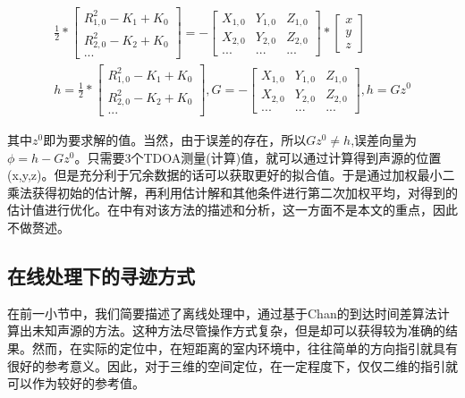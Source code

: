 \documentclass[winfonts]{njuthesis}
\begin{document}
		\begin{equation}
		\begin{aligned}
			& \frac{1}{2} * {
				\left[ 
					\begin{array}{c}
						R_{1,0}^2 - K_1 + K_0 \\
						R_{2,0}^2 - K_2 + K_0 \\
						...
					\end{array} 
				\right ]}
				= -{
				\left[ 
					\begin{array}{ccc}
						X_{1,0} & Y_{1,0} & Z_{1,0} \\
						X_{2,0} & Y_{2,0} & Z_{2,0} \\
						  ...   &  ...    &   ...
					\end{array}
				\right ]}*{
				\left[ 
					\begin{array}{c}
						x\\
						y\\
						z
					\end{array}
				\right ]} & \\
			& h = \frac{1}{2} * {
				\left[ 
				\begin{array}{c}
				R_{1,0}^2 - K_1 + K_0 \\
				R_{2,0}^2 - K_2 + K_0 \\
				...
				\end{array} 
				\right ]}, 
			G = -{
				\left[ 
				\begin{array}{ccc}
				X_{1,0} & Y_{1,0} & Z_{1,0} \\
				X_{2,0} & Y_{2,0} & Z_{2,0} \\
				...   &  ...    &   ...
				\end{array}
				\right ]},
			h = Gz^0
		\end{aligned}
		\end{equation}

		其中$z^0$即为要求解的值。当然，由于误差的存在，所以$Gz^0\neq h$,误差向量为$\phi = h - Gz^0$。只需要3个TDOA测量(计算)值，就可以通过计算得到声源的位置(x,y,z)。但是充分利于冗余数据的话可以获取更好的拟合值。于是通过加权最小二乘法获得初始的估计解，再利用估计解和其他条件进行第二次加权平均，对得到的估计值进行优化。在\cite{Chan3DTDOA}中有对该方法的描述和分析，这一方面不是本文的重点，因此不做赘述。
		
		\subsection{在线处理下的寻迹方式}
		
		在前一小节中，我们简要描述了离线处理中，通过基于Chan的到达时间差算法计算出未知声源的方法。这种方法尽管操作方式复杂，但是却可以获得较为准确的结果。然而，在实际的定位中，在短距离的室内环境中，往往简单的方向指引就具有很好的参考意义。因此，对于三维的空间定位，在一定程度下，仅仅二维的指引就可以作为较好的参考值。
		
\end{document}
